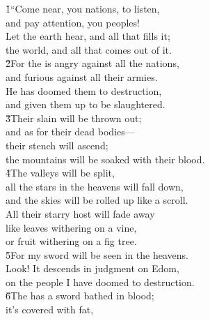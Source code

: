 \begin{poetry}
\poeml {}
\v{1}``Come near, you nations, to listen, \\
\poemll    and pay attention, you peoples! \\
\poeml Let the earth hear, and all that fills it; \\
\poemll    the world, and all that comes out of it. \\
\poeml \v{2}For the  is angry against all the nations, \\
\poemll    and furious against all their armies. \\
\poeml He has doomed them to destruction, \\
\poemll    and given them up to be slaughtered. \\
\poeml \v{3}Their slain will be thrown out; \\
\poemll    and as for their dead bodies--- \\
\poeml their stench will ascend; \\
\poemll    the mountains will be soaked with their blood. \\
\poeml \v{4}The valleys will be split, \\
\poemll    all the stars in the heavens will fall down, \\
\poemlll       and the skies will be rolled up like a scroll. \\
\poeml All their starry host will fade away \\
\poemll    like leaves withering on a vine, \\
\poemlll       or fruit withering on a fig tree. \\
\poeml \v{5}For my sword will be seen in the heavens. \\
\poemll    Look! It descends in judgment on Edom, \\
\poemlll       on the people I have doomed to destruction. \\
\poeml \v{6}The  has a sword bathed in blood; \\
\poemll    it's covered with fat, \\

\end{poetry}
